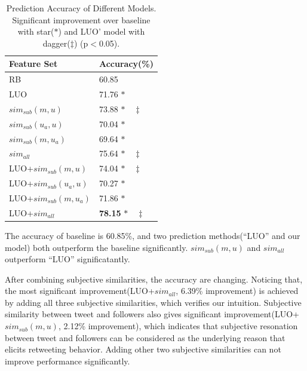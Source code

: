 \documentclass[letterpaper]{article}
\begin{document}
\begin{table}[h]
\centering
\caption{Prediction Accuracy of Different Models. Significant improvement over baseline with star($ \ast $) and LUO' model with dagger($ \ddagger $) (p$ < $0.05).}
\label{tab4}
\begin{tabular}{|l|l|}
\hline
Feature Set & Accuracy(\%) \\
\hline
RB & 60.85  \\
LUO & 71.76 $ \ast  $\\
$ sim_{sub} \left( m,u \right) $ & 73.88 $ \ast \quad \ddagger $\\
$ sim_{sub}\left( u_{a},u \right)  $ & 70.04 $ \ast  $\\
$ sim_{sub}\left( m,u_{a} \right)  $ &69.64 $ \ast  $\\
$ sim_{all}  $ & 75.64 $ \ast  \quad \ddagger $\\
LUO+$ sim_{sub} \left( m,u \right)$ & 74.04  $ \ast \quad \ddagger $ \\
LUO+$ sim_{sub}\left( u_{a},u \right)$ & 70.27  $ \ast $ \\
LUO+$ sim_{sub}\left( m,u_{a} \right)$ & 71.86  $ \ast $ \\
LUO+$ sim_{all}  $ & \textbf{78.15}  $ \ast \quad \ddagger $ \\
\hline
\end{tabular}
\end{table}

The accuracy of baseline is 60.85\%, and two prediction methods(``LUO'' and our model) both outperform the baseline significantly. 
$ sim_{sub} \left( m,u \right) $ and $ sim_{all}  $ outperform ``LUO'' significatantly.

After combining subjective similarities, the accuracy are changing. 
Noticing that, the most significant improvement(LUO+$ sim_{all}  $, 6.39\% improvement) is achieved by adding all three subjective similarities, which verifies our intuition. 
Subjective similarity between tweet and followers also gives significant improvement(LUO+$ sim_{sub} \left( m,u \right) $, 2.12\% improvement), which indicates that subjective resonation between tweet and followers can be considered as the underlying reason that elicits retweeting behavior. 
Adding other two subjective similarities can not improve performance significantly.
\end{document}
